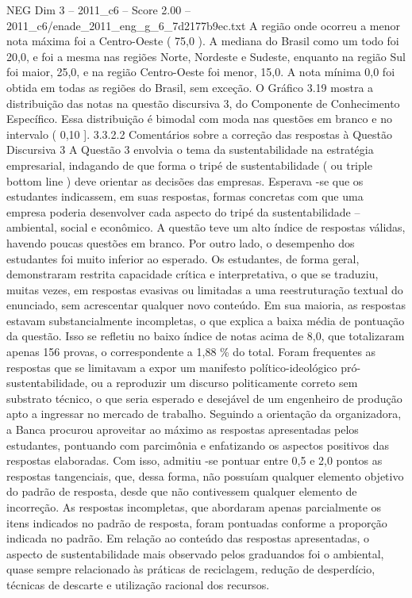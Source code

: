 \begin{textsample}{NEG Dim 3 – 2011\_c6 – Score 2.00 – 2011\_c6/enade\_2011\_eng\_g\_6\_7d2177b9ec.txt}
A região onde ocorreu a menor nota máxima foi a Centro-Oeste ( 75,0 ).
A mediana do Brasil como um todo foi 20,0, e foi a mesma nas regiões Norte, Nordeste e Sudeste, enquanto na região Sul foi maior, 25,0, e na região Centro-Oeste foi menor, 15,0.
A nota mínima 0,0 foi obtida em todas as regiões do Brasil, sem exceção.
O Gráfico 3.19 mostra a distribuição das notas na questão discursiva 3, do Componente de Conhecimento Específico.
Essa distribuição é bimodal com moda nas questões em branco e no intervalo ( 0,10 ]. 3.3.2.2 Comentários sobre a correção das respostas à Questão Discursiva 3 A Questão 3 envolvia o tema da sustentabilidade na estratégia empresarial, indagando de que forma o tripé de sustentabilidade ( ou triple bottom line ) deve orientar as decisões das empresas.
Esperava -se que os estudantes indicassem, em suas respostas, formas concretas com que uma empresa poderia desenvolver cada aspecto do tripé da sustentabilidade – ambiental, social e econômico.
A questão teve um alto índice de respostas válidas, havendo poucas questões em branco.
Por outro lado, o desempenho dos estudantes foi muito inferior ao esperado.
Os estudantes, de forma geral, demonstraram restrita capacidade crítica e interpretativa, o que se traduziu, muitas vezes, em respostas evasivas ou limitadas a uma reestruturação textual do enunciado, sem acrescentar qualquer novo conteúdo.
Em sua maioria, as respostas estavam substancialmente incompletas, o que explica a baixa média de pontuação da questão.
Isso se refletiu no baixo índice de notas acima de 8,0, que totalizaram apenas 156 provas, o correspondente a 1,88 \% do total.
Foram frequentes as respostas que se limitavam a expor um manifesto político-ideológico pró-sustentabilidade, ou a reproduzir um discurso politicamente correto sem substrato técnico, o que seria esperado e desejável de um engenheiro de produção apto a ingressar no mercado de trabalho.
Seguindo a orientação da organizadora, a Banca procurou aproveitar ao máximo as respostas apresentadas pelos estudantes, pontuando com parcimônia e enfatizando os aspectos positivos das respostas elaboradas.
Com isso, admitiu -se pontuar entre 0,5 e 2,0 pontos as respostas tangenciais, que, dessa forma, não possuíam qualquer elemento objetivo do padrão de resposta, desde que não contivessem qualquer elemento de incorreção.
As respostas incompletas, que abordaram apenas parcialmente os itens indicados no padrão de resposta, foram pontuadas conforme a proporção indicada no padrão.
Em relação ao conteúdo das respostas apresentadas, o aspecto de sustentabilidade mais observado pelos graduandos foi o ambiental, quase sempre relacionado às práticas de reciclagem, redução de desperdício, técnicas de descarte e utilização racional dos recursos.

\end{textsample}
